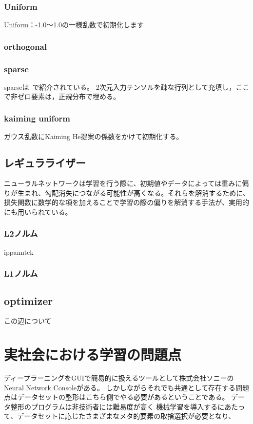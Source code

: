\subsubsection{Uniform}
Uniform：-1.0～1.0の一様乱数で初期化します
\subsubsection{orthogonal}
\subsubsection{sparse}
sparseは~\cite{sim}で紹介されている。
2次元入力テンソルを疎な行列として充填し，ここで非ゼロ要素は，正規分布で埋める。
\subsubsection{kaiming uniform}
ガウス乱数にKaiming He提案の係数をかけて初期化する。

\subsection{レギュラライザー}
ニューラルネットワークは学習を行う際に、初期値やデータによっては重みに偏りが生まれ、勾配消失につながる可能性が高くなる。それらを解消するために、損失関数に数学的な項を加えることで学習の際の偏りを解消する手法が、実用的にも用いられている。
\subsubsection{L2ノルム}
ippanntek
\subsubsection{L1ノルム}

\subsection{optimizer}
この辺について



\section{実社会における学習の問題点}
ディープラーニングをGUIで簡易的に扱えるツールとして株式会社ソニーのNeural Network Consoleがある。
しかしながらそれでも共通として存在する問題点はデータセットの整形はこちら側でやる必要があるということである。
データ整形のプログラムは非技術者には難易度が高く
機械学習を導入するにあたって、データセットに応じたさまざまなメタ的要素の取捨選択が必要となり、

